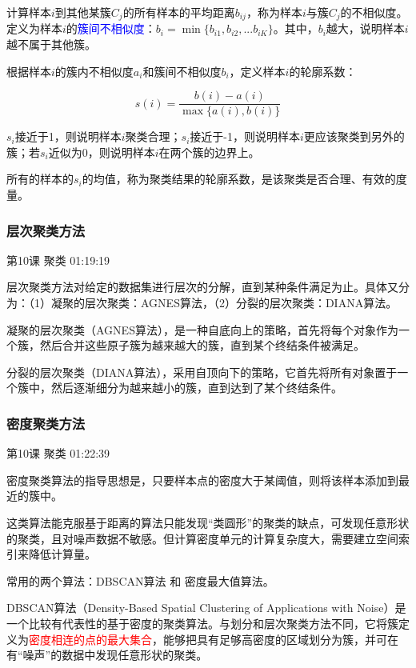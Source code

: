 \documentclass[UTF8]{ctexart}
\begin{document}
计算样本$i$到其他某簇$C_{j}$的所有样本的平均距离$b_{ij}$，称为样本$i$与簇$C_{j}$的不相似度。定义为样本$i$的\textcolor{blue}{簇间不相似度}：$b_{i}=\min \{ b_{i1},b_{i2},...b_{iK} \}$。其中，$b_{i}$越大，说明样本$i$越不属于其他簇。

根据样本$i$的簇内不相似度$a_{i}$和簇间不相似度$b_{i}$，定义样本$i$的轮廓系数：

\begin{displaymath}
s(i)=\frac{b(i)-a(i)}{\max \{ a(i),b(i)\}}
\end{displaymath}

$s_{i}$接近于1，则说明样本$i$聚类合理；$s_{i}$接近于-1，则说明样本$i$更应该聚类到另外的簇；若$s_{i}$近似为0，则说明样本$i$在两个簇的边界上。

所有的样本的$s_{i}$的均值，称为聚类结果的轮廓系数，是该聚类是否合理、有效的度量。

\subsubsection{层次聚类方法}

第10课 聚类 01:19:19

层次聚类方法对给定的数据集进行层次的分解，直到某种条件满足为止。具体又分为：（1）凝聚的层次聚类：AGNES算法，（2）分裂的层次聚类：DIANA算法。

凝聚的层次聚类（AGNES算法），是一种自底向上的策略，首先将每个对象作为一个簇，然后合并这些原子簇为越来越大的簇，直到某个终结条件被满足。

分裂的层次聚类（DIANA算法），采用自顶向下的策略，它首先将所有对象置于一个簇中，然后逐渐细分为越来越小的簇，直到达到了某个终结条件。

\subsubsection{密度聚类方法}

第10课 聚类 01:22:39

密度聚类算法的指导思想是，只要样本点的密度大于某阈值，则将该样本添加到最近的簇中。

这类算法能克服基于距离的算法只能发现“类圆形”的聚类的缺点，可发现任意形状的聚类，且对噪声数据不敏感。但计算密度单元的计算复杂度大，需要建立空间索引来降低计算量。

常用的两个算法：DBSCAN算法 和 密度最大值算法。

DBSCAN算法（Density-Based Spatial Clustering of Applications with Noise）是一个比较有代表性的基于密度的聚类算法。与划分和层次聚类方法不同，它将簇定义为\textcolor{red}{密度相连的点的最大集合}，能够把具有足够高密度的区域划分为簇，并可在有“噪声”的数据中发现任意形状的聚类。
\end{document}
